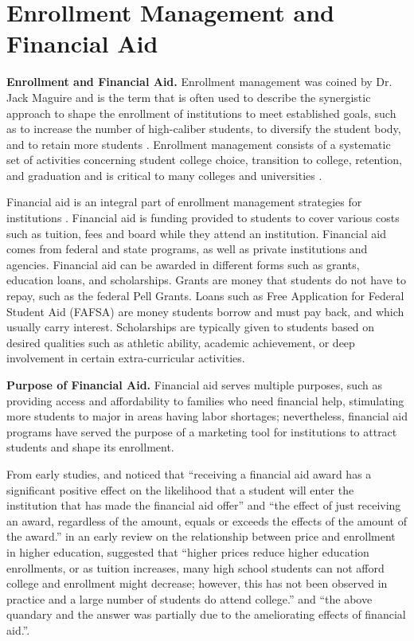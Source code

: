 \documentclass[12pt,english]{report}
\begin{document}
\section{Enrollment Management and Financial Aid}

\noindent \textbf{Enrollment and Financial Aid.} Enrollment management was coined by Dr. Jack Maguire \citep{Maguire1976} and is the term that is often used to describe the synergistic approach to shape the enrollment of institutions to meet established goals, such as to increase the number of high-caliber students, to diversify the student body, and to retain more students \citep{Kemerer1982}. Enrollment management consists of a systematic set of activities concerning student college choice, transition to college, retention, and graduation \citep{Hossler1990} and is critical to many colleges and universities \citep{Braunstein1999, Maltz2007, Aksenova2006}. 

Financial aid is an integral part of enrollment management strategies for institutions \citep{Dynarski2013}.  Financial aid is funding provided to students to cover various costs such as tuition, fees and board  while they attend an institution. Financial aid comes from federal and state programs, as well as private institutions and agencies. Financial aid can be awarded in different forms such as grants, education loans, and scholarships. Grants are money that students do not have to repay, such as the  federal Pell Grants. Loans such as Free Application for  Federal Student Aid (FAFSA) are money students borrow and  must pay back, and which usually carry interest. Scholarships are typically given  to students  based on desired qualities such as athletic ability, academic  achievement, or deep involvement in certain extra-curricular activities. 

\vspace{0.15in}
\noindent \textbf{Purpose of Financial Aid.} Financial aid serves multiple purposes, such as providing access and affordability to families who need financial help, stimulating more students to major in areas having labor shortages; nevertheless, financial aid programs have served the purpose of a marketing tool for institutions to attract students and shape its enrollment. 

From early studies, \citet{Heller1997} and \citet{Leslie1988} noticed that ``receiving a financial aid award has a significant positive effect on the likelihood that a student will enter the institution that has made the financial aid offer'' and ``the effect of just receiving an award, regardless of the amount, equals or exceeds the effects of the amount of the award.'' \citep{Leslie1987} in an early review on the relationship between price and enrollment in higher education, suggested that ``higher prices reduce higher education enrollments, or as tuition increases, many high school students can not afford college and enrollment might decrease; however, this has not been observed in practice and a large number of students do attend college.'' and ``the above quandary and the answer was partially due to the ameliorating effects of financial aid.''.
\end{document}
